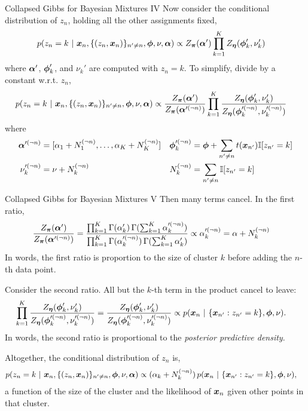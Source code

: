 \documentclass[aspectratio=169]{beamer}
\begin{document}
\begin{frame}{Collapsed Gibbs for Bayesian Mixtures IV}
Now consider the conditional distribution of $z_n$, holding all the other assignments fixed,
\begin{align}
    p(z_n=k ~\vert~ \boldsymbol{x}_n, \{(z_n, \boldsymbol{x}_n)\}_{n' \neq n}, \boldsymbol{\phi}, \nu, \boldsymbol{\alpha}) 
    &\propto
    Z_{\boldsymbol{\pi}}(\boldsymbol{\alpha}') \prod_{k=1}^K Z_{\boldsymbol{\eta}}(\boldsymbol{\phi}_k', \nu_k')
\end{align}
where $\boldsymbol{\alpha}'$, $\boldsymbol{\phi}_k'$, and $\nu_k'$ are computed with $z_n=k$. To simplify, divide by a constant w.r.t. $z_n$,
\begin{align}
    p(z_n=k ~\vert~ \boldsymbol{x}_n, \{(z_n, \boldsymbol{x}_n)\}_{n' \neq n}, \boldsymbol{\phi}, \nu, \boldsymbol{\alpha}) 
    &\propto
    \frac{Z_{\boldsymbol{\pi}}(\boldsymbol{\alpha}')}{Z_{\boldsymbol{\pi}}(\boldsymbol{\alpha}'^{(\neg n)})} \prod_{k=1}^K \frac{Z_{\boldsymbol{\eta}}(\boldsymbol{\phi}_k', \nu_k')}{Z_{\boldsymbol{\eta}}(\boldsymbol{\phi}_k'^{(\neg n)}, \nu_k'^{(\neg n)})}
\end{align}
where
\begin{align}
    \boldsymbol{\alpha}'^{(\neg n)} &= [\alpha_1 + N_1^{(\neg n)}, \ldots, \alpha_K + N_K^{(\neg n)}] &
    \boldsymbol{\phi}_k'^{(\neg n)} &= \boldsymbol{\phi} + \sum_{n' \neq n} t(\boldsymbol{x}_{n'}) \mathbb{I}[z_{n'}=k] \\
    \nu_k'^{(\neg n)} &= \nu + N_k^{(\neg n)} &
    N_k^{(\neg n)} &= \sum_{n' \neq n} \mathbb{I}[z_{n'} = k]
\end{align}

\end{frame}

\begin{frame}{Collapsed Gibbs for Bayesian Mixtures V}
Then many terms cancel. In the first ratio,
\begin{align}
    \frac{Z_{\boldsymbol{\pi}}(\boldsymbol{\alpha}')}{Z_{\boldsymbol{\pi}}(\boldsymbol{\alpha}'^{(\neg n)})} &= \frac{\prod_{k=1}^K \Gamma(\alpha_k') \, \Gamma(\sum_{k=1}^K \alpha_{k}'^{(\neg n)})}{\prod_{k=1}^K \Gamma(\alpha_k'^{(\neg n)}) \, \Gamma(\sum_{k=1}^K \alpha_{k}')} 
    \propto \alpha_k'^{(\neg n)} = \alpha + N_k^{(\neg n)}
\end{align}
In words, the first ratio is proportion to the size of cluster $k$ before adding the $n$-th data point.

Consider the second ratio. All but the $k$-th term in the product cancel to leave:
\begin{align}
    \prod_{k=1}^K \frac{Z_{\boldsymbol{\eta}}(\boldsymbol{\phi}_k', \nu_k')}{Z_{\boldsymbol{\eta}}(\boldsymbol{\phi}_k'^{(\neg n)}, \nu_k'^{(\neg n)})} 
    = \frac{Z_{\boldsymbol{\eta}}(\boldsymbol{\phi}_k', \nu_k')}{Z_{\boldsymbol{\eta}}(\boldsymbol{\phi}_k'^{(\neg n)}, \nu_k'^{(\neg n)})}
    &\propto p(\boldsymbol{x}_n ~\vert~ \{\boldsymbol{x}_{n'}: z_{n'} = k\}, \boldsymbol{\phi}, \nu).
\end{align}
In words, the second ratio is proportional to the \textit{posterior predictive density}.

Altogether, the conditional distribution of $z_n$ is,
\begin{align}
    p(z_n=k ~\vert~ \boldsymbol{x}_n, \{(z_n, \boldsymbol{x}_n)\}_{n' \neq n}, \boldsymbol{\phi}, \nu, \boldsymbol{\alpha}) 
    &\propto (\alpha_k + N_k^{(\neg n)}) \, p(\boldsymbol{x}_n ~\vert~ \{\boldsymbol{x}_{n'}: z_{n'} = k\}, \boldsymbol{\phi}, \nu),
\end{align}
a function of the size of the cluster and the likelihood of $\boldsymbol{x}_n$ given other points in that cluster.

\end{frame}
\end{document}
